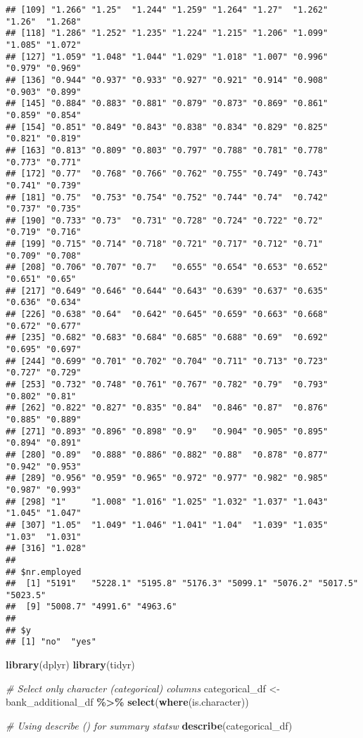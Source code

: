 \documentclass[
]{article}
\newenvironment{Shaded}{\begin{snugshade}}{\end{snugshade}}
\newcommand{\CommentTok}[1]{\textcolor[rgb]{0.56,0.35,0.01}{\textit{#1}}}
\newcommand{\FunctionTok}[1]{\textcolor[rgb]{0.13,0.29,0.53}{\textbf{#1}}}
\newcommand{\NormalTok}[1]{#1}
\newcommand{\OtherTok}[1]{\textcolor[rgb]{0.56,0.35,0.01}{#1}}
\newcommand{\SpecialCharTok}[1]{\textcolor[rgb]{0.81,0.36,0.00}{\textbf{#1}}}
\begin{document}
\begin{verbatim}
## [109] "1.266" "1.25"  "1.244" "1.259" "1.264" "1.27"  "1.262" "1.26"  "1.268"
## [118] "1.286" "1.252" "1.235" "1.224" "1.215" "1.206" "1.099" "1.085" "1.072"
## [127] "1.059" "1.048" "1.044" "1.029" "1.018" "1.007" "0.996" "0.979" "0.969"
## [136] "0.944" "0.937" "0.933" "0.927" "0.921" "0.914" "0.908" "0.903" "0.899"
## [145] "0.884" "0.883" "0.881" "0.879" "0.873" "0.869" "0.861" "0.859" "0.854"
## [154] "0.851" "0.849" "0.843" "0.838" "0.834" "0.829" "0.825" "0.821" "0.819"
## [163] "0.813" "0.809" "0.803" "0.797" "0.788" "0.781" "0.778" "0.773" "0.771"
## [172] "0.77"  "0.768" "0.766" "0.762" "0.755" "0.749" "0.743" "0.741" "0.739"
## [181] "0.75"  "0.753" "0.754" "0.752" "0.744" "0.74"  "0.742" "0.737" "0.735"
## [190] "0.733" "0.73"  "0.731" "0.728" "0.724" "0.722" "0.72"  "0.719" "0.716"
## [199] "0.715" "0.714" "0.718" "0.721" "0.717" "0.712" "0.71"  "0.709" "0.708"
## [208] "0.706" "0.707" "0.7"   "0.655" "0.654" "0.653" "0.652" "0.651" "0.65" 
## [217] "0.649" "0.646" "0.644" "0.643" "0.639" "0.637" "0.635" "0.636" "0.634"
## [226] "0.638" "0.64"  "0.642" "0.645" "0.659" "0.663" "0.668" "0.672" "0.677"
## [235] "0.682" "0.683" "0.684" "0.685" "0.688" "0.69"  "0.692" "0.695" "0.697"
## [244] "0.699" "0.701" "0.702" "0.704" "0.711" "0.713" "0.723" "0.727" "0.729"
## [253] "0.732" "0.748" "0.761" "0.767" "0.782" "0.79"  "0.793" "0.802" "0.81" 
## [262] "0.822" "0.827" "0.835" "0.84"  "0.846" "0.87"  "0.876" "0.885" "0.889"
## [271] "0.893" "0.896" "0.898" "0.9"   "0.904" "0.905" "0.895" "0.894" "0.891"
## [280] "0.89"  "0.888" "0.886" "0.882" "0.88"  "0.878" "0.877" "0.942" "0.953"
## [289] "0.956" "0.959" "0.965" "0.972" "0.977" "0.982" "0.985" "0.987" "0.993"
## [298] "1"     "1.008" "1.016" "1.025" "1.032" "1.037" "1.043" "1.045" "1.047"
## [307] "1.05"  "1.049" "1.046" "1.041" "1.04"  "1.039" "1.035" "1.03"  "1.031"
## [316] "1.028"
## 
## $nr.employed
##  [1] "5191"   "5228.1" "5195.8" "5176.3" "5099.1" "5076.2" "5017.5" "5023.5"
##  [9] "5008.7" "4991.6" "4963.6"
## 
## $y
## [1] "no"  "yes"
\end{verbatim}

\begin{Shaded}
\begin{Highlighting}[]
\FunctionTok{library}\NormalTok{(dplyr)}
\FunctionTok{library}\NormalTok{(tidyr)}

\CommentTok{\# Select only character (categorical) columns}
\NormalTok{categorical\_df }\OtherTok{\textless{}{-}}\NormalTok{ bank\_additional\_df }\SpecialCharTok{\%\textgreater{}\%} \FunctionTok{select}\NormalTok{(}\FunctionTok{where}\NormalTok{(is.character))}

\CommentTok{\# Using describe () for summary statsw}
\FunctionTok{describe}\NormalTok{(categorical\_df)}
\end{Highlighting}
\end{Shaded}
\end{document}
